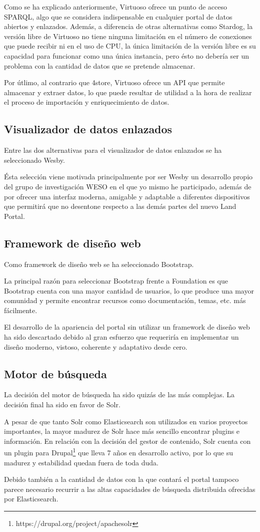 Como se ha explicado anteriormente, Virtuoso ofrece un punto de acceso SPARQL, algo que se considera indispensable en cualquier portal de datos abiertos y enlazados.  Además, a diferencia de otras alternativas como Stardog, la versión libre de Virtuoso no tiene ninguna limitación en el número de conexiones que puede recibir ni en el uso de CPU, la única limitación de la versión libre es su capacidad para funcionar como una única instancia, pero ésto no debería ser un problema con la cantidad de datos que se pretende almacenar.

Por útlimo, al contrario que 4store, Virtuoso ofrece un API que permite almacenar y extraer datos, lo que puede resultar de utilidad a la hora de realizar el proceso de importación y enriquecimiento de datos.


\subsection{Visualizador de datos enlazados}
Entre las dos alternativas para el visualizador de datos enlazados se ha seleccionado Wesby.

Ésta selección viene motivada principalmente por ser Wesby un desarrollo propio del grupo de investigación WESO en el que yo mismo he participado, además de por ofrecer una interfaz moderna, amigable y adaptable a diferentes dispositivos que permitirá que no desentone respecto a las demás partes del nuevo Land Portal.


\subsection{Framework de diseño web}
Como framework de diseño web se ha seleccionado Bootstrap.

La principal razón para seleccionar Bootstrap frente a Foundation es que Bootstrap cuenta con una mayor cantidad de usuarios, lo que produce una mayor comunidad y permite encontrar recursos como documentación, temas, etc. más fácilmente.

El desarrollo de la apariencia del portal sin utilizar un framework de diseño web ha sido descartado debido al gran esfuerzo que requeriría en implementar un diseño moderno, vistoso, coherente y adaptativo desde cero.


\subsection{Motor de búsqueda}
La decisión del motor de búsqueda ha sido quizás de las más complejas. La decisión final ha sido en favor de Solr.

A pesar de que tanto Solr como Elasticsearch son utilizados en varios proyectos importantes, la mayor madurez de Solr hace más sencillo encontrar plugins e información.  En relación con la decisión del gestor de contenido, Solr cuenta con un plugin para Drupal\footnote{https://drupal.org/project/apachesolr} que lleva 7 años en desarrollo activo, por lo que su madurez y estabilidad quedan fuera de toda duda.

Debido también a la cantidad de datos con la que contará el portal tampoco parece necesario recurrir a las altas capacidades de búsqueda distribuida ofrecidas por Elasticsearch.

